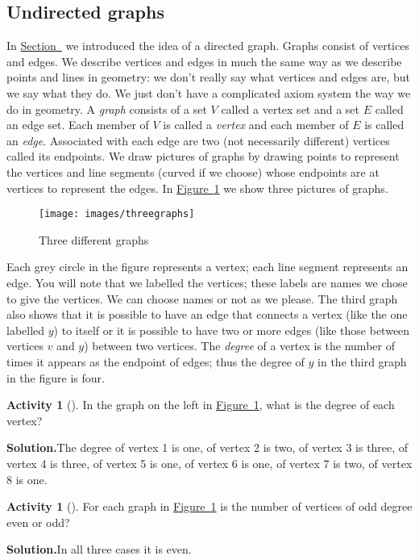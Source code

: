 \documentclass[10pt,]{book}
\theoremstyle{plain}
\theoremstyle{definition}
\newtheorem{activity}[project]{Activity}
\numberwithin{equation}{chapter}
\begin{document}
\subsection[{Undirected graphs}]{Undirected graphs}\label{graphsection}
In \hyperref[Ramseysection]{Section~} we introduced the idea of a directed graph. Graphs consist of vertices and edges. We describe vertices and edges in much the same way as we describe points and lines in geometry: we don't really say what vertices and edges are, but we say what they do. We just don't have a complicated axiom system the way we do in geometry. A \emph{graph} consists of a set \(V\) called a vertex set and a set \(E\) called an edge set. Each member of \(V\) is called a \emph{vertex} and each member of \(E\) is called an \emph{edge}. Associated with each edge are two (not necessarily different) vertices called its endpoints. We draw pictures of graphs by drawing points to represent the vertices and line segments (curved if we choose) whose endpoints are at vertices to represent the edges. In \hyperref[Threegraphs]{Figure~\ref{Threegraphs}} we show three pictures of graphs.%
\begin{figure}
\centering
\texttt{[image: images/threegraphs]}
\caption{Three different graphs\label{Threegraphs}}
\end{figure}
Each grey circle in the figure represents a vertex; each line segment represents an edge. You will note that we labelled the vertices; these labels are names we chose to give the vertices. We can choose names or not as we please. The third graph also shows that it is possible to have an edge that connects a vertex (like the one labelled \(y\)) to itself or it is possible to have two or more edges (like those between vertices \(v\) and \(y\)) between two vertices. The \emph{degree} of a vertex is the number of times it appears as the endpoint of edges; thus the degree of \(y\) in the third graph in the figure is four.%
\begin{activity}[]\label{activity-92}
In the graph on the left in \hyperref[Threegraphs]{Figure~\ref{Threegraphs}}, what is the degree of each vertex?%
\par\medskip\noindent%
\textbf{Solution.}\quad The degree of vertex 1 is one, of vertex 2 is two, of vertex 3 is three, of vertex 4 is three, of vertex 5 is one, of vertex 6 is one, of vertex 7 is two, of vertex 8 is one.%
\end{activity}
\begin{activity}[]\label{activity-93}
For each graph in \hyperref[Threegraphs]{Figure~\ref{Threegraphs}} is the number of vertices of odd degree even or odd?%
\par\medskip\noindent%
\textbf{Solution.}\quad In all three cases it is even.%
\end{activity}
\end{document}
